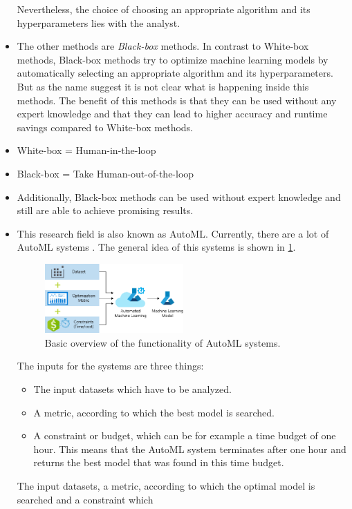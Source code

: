\begin{itemize}
    Nevertheless, the choice of choosing an appropriate algorithm and its hyperparameters lies with the analyst.
    \item The other methods are \textit{Black-box} methods.
    In contrast to White-box methods, Black-box methods try to optimize machine learning models by automatically selecting an appropriate algorithm and its hyperparameters.
    But as the name suggest it is not clear what is happening inside this methods.
    The benefit of this methods is that they can be used without any expert knowledge and that they can lead to  higher accuracy and runtime savings compared to White-box methods.
    \item White-box = Human-in-the-loop
    \item Black-box = Take Human-out-of-the-loop
    \item Additionally, Black-box methods can be used without expert knowledge and still are able to achieve promising results.
    \item This research field is also known as \gls{AutoML}.
    Currently, there are a lot of \gls{AutoML} systems .
    The general idea of this systems is shown in \cref{fig:automlWorkflow}.
    \begin{figure}
        \centering
        \includegraphics[width=0.5\textwidth]{graphics/flow_autom.png}
        \caption{Basic overview of the functionality of AutoML systems.}
        \label{fig:automlWorkflow}
    \end{figure}
    The inputs for the systems are three things: 
    \begin{itemize}
        \item The input datasets which have to be analyzed.
        \item A metric, according to which  the best model is searched.
        \item A constraint or budget, which can be for example a time budget of one hour.
        This means that the AutoML system terminates after one hour and returns the best model that was found in this time budget.
    \end{itemize}
    The input datasets, a metric, according to which the optimal model is searched and a constraint which  
    

\end{itemize}
